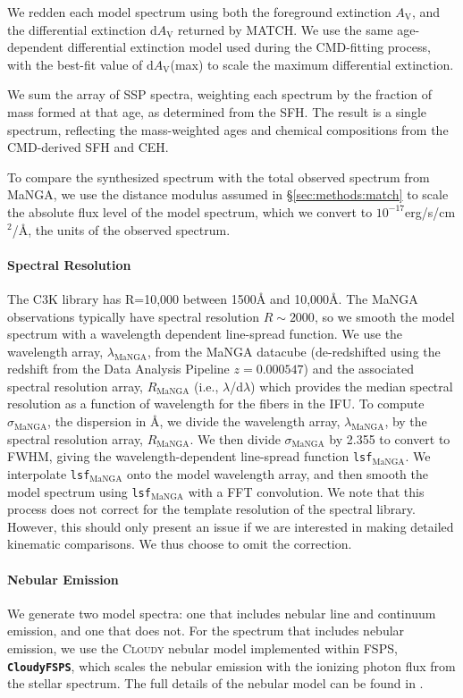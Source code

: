 \documentclass[preprint2]{aastex62}
\newcommand{\FSPS}{{\sc FSPS}\xspace}
\newcommand{\CloudyFSPS}{{\tt \textbf{CloudyFSPS}}\xspace}
\newcommand{\Cloudy}{\textsc{Cloudy}\xspace}
\newcommand{\ang}{\ensuremath{\mbox{\AA}}\xspace}
\newcommand{\Av}{\ensuremath{A_{\mathrm{V}}}\xspace}
\newcommand{\dAv}{\ensuremath{\mathrm{d}A_{\mathrm{V}}}\xspace}
\begin{document}
We redden each model spectrum using both the foreground extinction \Av, and the differential extinction \dAv returned by MATCH. We use the same age-dependent differential extinction model used during the CMD-fitting process, with the best-fit value of \dAv(max) to scale the maximum differential extinction.

We sum the array of SSP spectra, weighting each spectrum by the fraction of mass formed at that age, as determined from the SFH. The result is a single spectrum, reflecting the mass-weighted ages and chemical compositions from the CMD-derived SFH and CEH.

To compare the synthesized spectrum with the total observed spectrum from MaNGA, we use the distance modulus assumed in \S\ref{sec:methods:match} to scale the absolute flux level of the model spectrum, which we convert to $10^{-17}$erg/s/cm$^2$/\ang, the units of the observed spectrum.

\paragraph{Spectral Resolution}
The C3K library has R=10,000 between 1500\ang and 10,000\ang. The MaNGA observations typically have spectral resolution $R\sim2000$, so we smooth the model spectrum with a wavelength dependent line-spread function. We use the wavelength array, $\lambda_{\mathrm{MaNGA}}$, from the MaNGA datacube (de-redshifted using the redshift from the Data Analysis Pipeline $z=0.000547$) and the associated spectral resolution array, $R_{\mathrm{MaNGA}}$ (i.e., $\lambda$/d$\lambda$) which provides the median spectral resolution as a function of wavelength for the fibers in the IFU. To compute $\sigma_{\mathrm{MaNGA}}$, the dispersion in \ang, we divide the wavelength array, $\lambda_{\mathrm{MaNGA}}$, by the spectral resolution array, $R_{\mathrm{MaNGA}}$. We then divide $\sigma_{\mathrm{MaNGA}}$ by 2.355 to convert to FWHM, giving the wavelength-dependent line-spread function {\tt lsf}$_{\mathrm{MaNGA}}$. We interpolate {\tt lsf}$_{\mathrm{MaNGA}}$ onto the model wavelength array, and then smooth the model spectrum using {\tt lsf}$_{\mathrm{MaNGA}}$ with a FFT convolution. We note that this process does not correct for the template resolution of the spectral library. However, this should only present an issue if we are interested in making detailed kinematic comparisons. We thus choose to omit the correction.
 
\paragraph{Nebular Emission}
We generate two model spectra: one that includes nebular line and continuum emission, and one that does not. For the spectrum that includes nebular emission, we use the \Cloudy nebular model implemented within \FSPS, \CloudyFSPS \citep{cloudyFSPSv1}, which scales the nebular emission with the ionizing photon flux from the stellar spectrum. The full details of the nebular model can be found in \citet{Byler+2017}.
\end{document}
